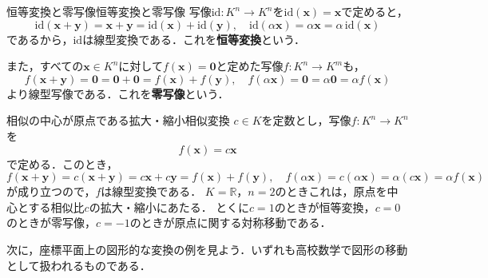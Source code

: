 \begin{example}{恒等変換と零写像}{恒等変換と零写像}
  写像$\mathrm{id} \colon K^n \to K^n$を$\mathrm{id}(\bm{x}) = \bm{x}$で定めると，
  \[
    \mathrm{id}(\bm{x} + \bm{y}) = \bm{x} + \bm{y} = \mathrm{id}(\bm{x}) + \mathrm{id}(\bm{y}), \quad
    \mathrm{id}(\alpha\bm{x}) = \alpha\bm{x} = \alpha\,\mathrm{id}(\bm{x})
  \]
  であるから，$\mathrm{id}$は線型変換である．これを\textbf{恒等変換}という．

  また，すべての$\bm{x} \in K^n$に対して$f(\bm{x}) = \bm{0}$と定めた写像$f \colon K^n \to K^m$も，
  \[
    f(\bm{x} + \bm{y}) = \bm{0} = \bm{0} + \bm{0} = f(\bm{x}) + f(\bm{y}), \quad
    f(\alpha\bm{x}) = \bm{0} = \alpha\bm{0} = \alpha f(\bm{x})
  \]
  より線型写像である．これを\textbf{零写像}という．
\end{example}

\begin{example}{相似の中心が原点である拡大・縮小}{相似変換}
  $c \in K$を定数とし，写像$f \colon K^n \to K^n$を
  \[
    f(\bm{x}) = c\bm{x}
  \]
  で定める．このとき，
  \[
    f(\bm{x} + \bm{y}) = c(\bm{x} + \bm{y}) = c\bm{x} + c\bm{y} = f(\bm{x}) + f(\bm{y}), \quad
    f(\alpha\bm{x}) = c(\alpha\bm{x}) = \alpha(c\bm{x}) = \alpha f(\bm{x})
  \]
  が成り立つので，$f$は線型変換である．
  $K = \mathbb{R}$，$n = 2$のときこれは，原点を中心とする相似比$c$の拡大・縮小にあたる．
  とくに$c = 1$のときが恒等変換，$c = 0$のときが零写像，$c = -1$のときが原点に関する対称移動である．
\end{example}

次に，座標平面上の図形的な変換の例を見よう．いずれも高校数学で図形の移動として扱われるものである．

